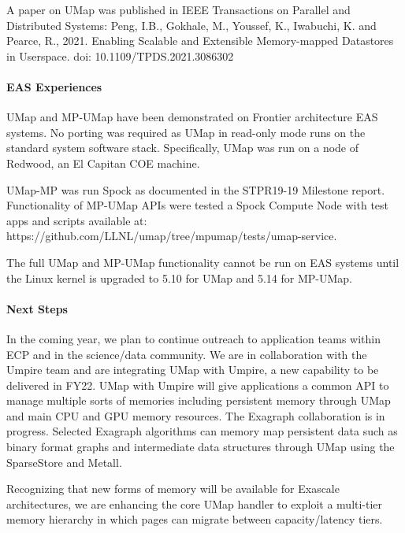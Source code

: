 A paper on UMap was published in IEEE Transactions on Parallel and
Distributed Systems:  Peng, I.B., Gokhale, M., Youssef, K., Iwabuchi,
K. and Pearce, R., 2021. Enabling Scalable and Extensible
Memory-mapped Datastores in Userspace. doi: 10.1109/TPDS.2021.3086302

\paragraph{EAS Experiences}

UMap and MP-UMap have been demonstrated on Frontier architecture EAS
systems. No porting was required as UMap in read-only mode runs on the
standard system software stack. Specifically, UMap was run on a node
of Redwood, an El Capitan COE machine.

  UMap-MP was run Spock as documented in the STPR19-19 Milestone
  report. Functionality of MP-UMap APIs were tested a Spock Compute
  Node with test apps and scripts available at:
https://github.com/LLNL/umap/tree/mpumap/tests/umap-service.

The full UMap and MP-UMap functionality cannot be run on EAS systems
until the Linux kernel is upgraded to 5.10 for UMap and 5.14 for MP-UMap.

\paragraph{Next Steps}
In the coming year, we plan to continue outreach to application teams
within ECP and in the science/data community. We are in collaboration
with the Umpire team and are integrating UMap with Umpire, a new
capability to be delivered in FY22. UMap with Umpire will give
applications a common API to manage multiple sorts of memories
including persistent memory through UMap and main CPU and GPU memory
resources. The Exagraph collaboration is in progress. Selected
Exagraph algorithms can memory map persistent data such as
binary format graphs and intermediate data structures through UMap
using the SparseStore and Metall.

Recognizing that new forms of memory will be available for Exascale
architectures, we are enhancing the core UMap handler to exploit a
multi-tier memory hierarchy in which pages can migrate between
capacity/latency tiers.

